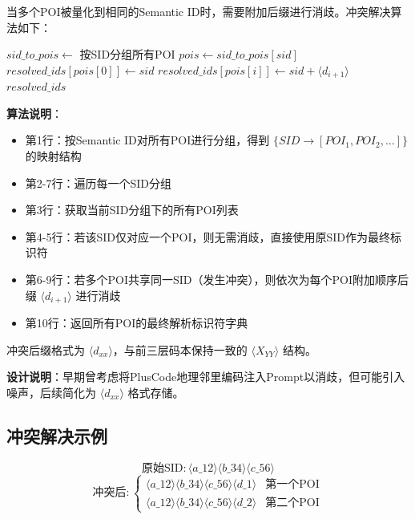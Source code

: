 当多个POI被量化到相同的Semantic ID时，需要附加后缀进行消歧。冲突解决算法如下：

\begin{algorithm}[htbp]
    \caption{SID冲突解决算法}
    \label{alg:collision}
    \begin{algorithmic}[1] %
        \State $sid\_to\_pois \gets$ 按SID分组所有POI
            \State $pois \gets sid\_to\_pois[sid]$
                \State $resolved\_ids[pois[0]] \gets sid$
            \Else {}
                    \State $resolved\_ids[pois[i]] \gets sid + \langle d_{i+1} \rangle$
                \EndFor
            \EndIf
        \EndFor
        \State \Return $resolved\_ids$
    \end{algorithmic}
\end{algorithm}

\textbf{算法说明}：
\begin{itemize}
    \item 第1行：按Semantic ID对所有POI进行分组，得到 $\{SID \rightarrow [POI_1, POI_2, ...]\}$ 的映射结构
    \item 第2-7行：遍历每一个SID分组
    \item 第3行：获取当前SID分组下的所有POI列表
    \item 第4-5行：若该SID仅对应一个POI，则无需消歧，直接使用原SID作为最终标识符
    \item 第6-9行：若多个POI共享同一SID（发生冲突），则依次为每个POI附加顺序后缀 $\langle d_{i+1} \rangle$ 进行消歧
    \item 第10行：返回所有POI的最终解析标识符字典
\end{itemize}

冲突后缀格式为 $\langle d_{xx} \rangle$，与前三层码本保持一致的 $\langle X_{YY} \rangle$ 结构。

\textbf{设计说明}：早期曾考虑将PlusCode地理邻里编码注入Prompt以消歧，但可能引入噪声，后续简化为 $\langle d_{xx} \rangle$ 格式存储。

\subsection{冲突解决示例}
\label{sec:collision_example}

\begin{equation}
\text{原始SID}: \langle a\_{12} \rangle \langle b\_{34} \rangle \langle c\_{56} \rangle
\end{equation}
\begin{equation}
\text{冲突后}:
\begin{cases}
\langle a\_{12} \rangle \langle b\_{34} \rangle \langle c\_{56} \rangle \langle d\_1 \rangle & \text{第一个POI}\\
\langle a\_{12} \rangle \langle b\_{34} \rangle \langle c\_{56} \rangle \langle d\_2 \rangle & \text{第二个POI}
\end{cases}
\end{equation}

